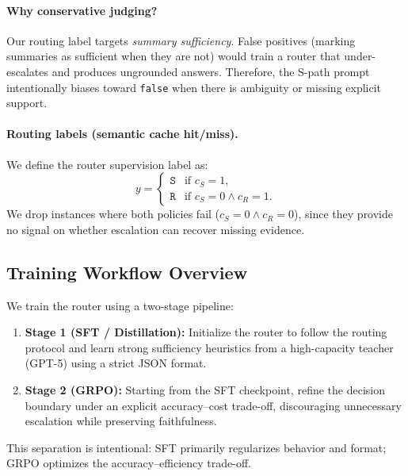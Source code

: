 \documentclass{article}
\theoremstyle{plain}
\theoremstyle{definition}
\theoremstyle{remark}
\begin{document}
\paragraph{Why conservative judging?}
Our routing label targets \emph{summary sufficiency}.
False positives (marking summaries as sufficient when they are not) would train a router that under-escalates and produces ungrounded answers.
Therefore, the S-path prompt intentionally biases toward \texttt{false} when there is ambiguity or missing explicit support.



\paragraph{Routing labels (semantic cache hit/miss).}
We define the router supervision label as:
\[
y =
\begin{cases}
\texttt{S} & \text{if } c_S = 1,\\
\texttt{R} & \text{if } c_S = 0 \land c_R = 1.
\end{cases}
\]
We drop instances where both policies fail ($c_S{=}0 \land c_R{=}0$), since they provide no signal on whether escalation can recover missing evidence.



\subsection{Training Workflow Overview}
\label{app:router_workflow}

We train the router using a two-stage pipeline:
\begin{enumerate}
  \item \textbf{Stage 1 (SFT / Distillation):} Initialize the router to follow the routing protocol and learn strong sufficiency heuristics from a high-capacity teacher (GPT-5) using a strict JSON format.
  \item \textbf{Stage 2 (GRPO):} Starting from the SFT checkpoint, refine the decision boundary under an explicit accuracy--cost trade-off, discouraging unnecessary escalation while preserving faithfulness.
\end{enumerate}
This separation is intentional: SFT primarily regularizes behavior and format; GRPO optimizes the accuracy--efficiency trade-off.

\end{document}
